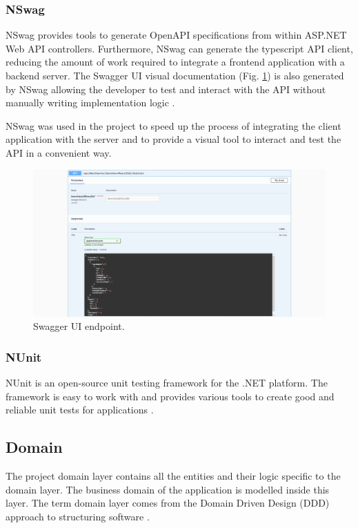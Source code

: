 \documentclass[a4paper,twoside,12pt]{book}
\begin{document}
\subsubsection{NSwag}
NSwag provides tools to generate OpenAPI specifications from within ASP.NET Web API controllers. Furthermore, NSwag can generate the typescript API client, reducing the amount of work required to integrate a frontend application with a backend server. The Swagger UI visual documentation (Fig. \ref{fig:swaggerEndpoint}) is also generated by NSwag allowing the developer to test and interact with the API without manually writing implementation logic \cite{bib:NSwag}.  

NSwag was used in the project to speed up the process of integrating the client application with the server and to provide a visual tool to interact and test the API in a convenient way.

\begin{figure} [H]
\centering
\includegraphics[width=\textwidth]{images/swaggerUI.jpg}
\caption{Swagger UI endpoint.}
\label{fig:swaggerEndpoint}
\end{figure}

\subsubsection{NUnit}
NUnit is an open-source unit testing framework for the .NET platform. The framework is easy to work with and provides various tools to create good and reliable unit tests for applications \cite{bib:NUnit}.

\subsection{Domain}

The project domain layer contains all the entities and their logic specific to the domain layer. The business domain of the application is modelled inside this layer. The term domain layer comes from the Domain Driven Design (DDD) approach to structuring software \cite{bib:cleanArchitectureImpl}. 
\end{document}
